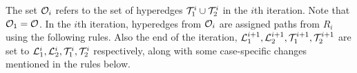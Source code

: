 The set ${\cal O}_i$ refers to the set of hyperedges ${\cal T}_1^i \cup {\cal T}_2^i$
in the $i$th iteration.  Note that ${\cal O}_1 = {\cal O}$.  In the $i$th
iteration, hyperedges from ${\cal O}_i$ are assigned paths from $R_i$ using
the following rules. Also the end of the iteration, ${\cal L}_1^{i+1},
{\cal L}_2^{i+1}, {\cal T}_1^{i+1}, {\cal T}_2^{i+1}$ are set to ${\cal L}_1^{i},
{\cal L}_2^{i}, {\cal T}_1^{i}, {\cal T}_2^{i}$ respectively, along with some
case-specific changes mentioned in the rules below.






